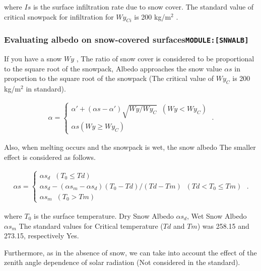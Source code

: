 where \(Is\) is the surface infiltration rate due to snow cover. The
standard value of critical snowpack for infiltration for \(Wy_{Ci}\) is
200 kg/m\(^2\) .

\hypertarget{evaluating-albedo-on-snow-covered-surfacesmodulesnwalb}{%
\subsubsection{\texorpdfstring{Evaluating albedo on snow-covered
surfaces\texttt{MODULE:{[}SNWALB{]}}}{Evaluating albedo on snow-covered surfacesMODULE:{[}SNWALB{]}}}\label{evaluating-albedo-on-snow-covered-surfacesmodulesnwalb}}

If you have a snow \(Wy\) , The ratio of snow cover is considered to be
proportional to the square root of the snowpack, Albedo approaches the
snow value \(\alpha s\) in proportion to the square root of the snowpack
(The critical value of \(Wy_C\) is 200 kg/m\(^2\) in standard).

\begin{eqnarray}
  \alpha = \left\{ 
  \begin{array}{ll}
    \alpha' + (\alpha s-\alpha')\sqrt{Wy/Wy_{C}} \;\;   (Wy < Wy_{C}) \\
    \alpha s                                            (Wy \ge Wy_{C})
  \end{array}
  \right. \; .
\end{eqnarray}

Also, when melting occurs and the snowpack is wet, the snow albedo The
smaller effect is considered as follows.

\begin{eqnarray}
  \alpha s = \left\{
    \begin{array}{ll}
      \alpha s_d                         \;\; (T_0 \le Td) \\
      \alpha s_d - (\alpha s_m -\alpha s_d)
                   (T_0 - Td)/(Td - Tm)  \;\; (Td < T_0 \le Tm) \\
      \alpha s_m                         \;\; (T_0 > Tm)
    \end{array}
  \right. \; .
\end{eqnarray}

where \(T_0\) is the surface temperature. Dry Snow Albedo
\(\alpha s_d\), Wet Snow Albedo \(\alpha s_m\) The standard values for
Critical temperature (\(Td\) and \(Tm\)) was 258.15 and 273.15,
respectively Yes.

Furthermore, as in the absence of snow, we can take into account the
effect of the zenith angle dependence of solar radiation (Not considered
in the standard).

